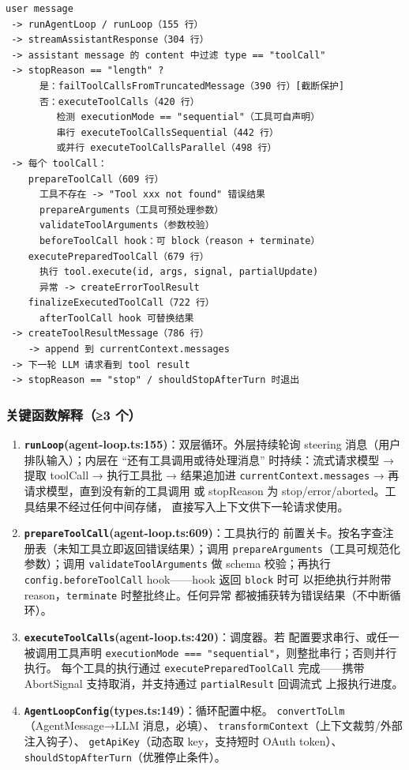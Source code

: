 \begin{verbatim}
user message
 -> runAgentLoop / runLoop（155 行）
 -> streamAssistantResponse（304 行）
 -> assistant message 的 content 中过滤 type == "toolCall"
 -> stopReason == "length" ?
      是：failToolCallsFromTruncatedMessage（390 行）[截断保护]
      否：executeToolCalls（420 行）
         检测 executionMode == "sequential"（工具可自声明）
         串行 executeToolCallsSequential（442 行）
         或并行 executeToolCallsParallel（498 行）
 -> 每个 toolCall：
    prepareToolCall（609 行）
      工具不存在 -> "Tool xxx not found" 错误结果
      prepareArguments（工具可预处理参数）
      validateToolArguments（参数校验）
      beforeToolCall hook：可 block（reason + terminate）
    executePreparedToolCall（679 行）
      执行 tool.execute(id, args, signal, partialUpdate)
      异常 -> createErrorToolResult
    finalizeExecutedToolCall（722 行）
      afterToolCall hook 可替换结果
 -> createToolResultMessage（786 行）
    -> append 到 currentContext.messages
 -> 下一轮 LLM 请求看到 tool result
 -> stopReason == "stop" / shouldStopAfterTurn 时退出
\end{verbatim}

\subsubsection{关键函数解释（≥3 个）}

\begin{enumerate}[leftmargin=4em,itemsep=0pt,topsep=2pt]
    \item \textbf{\texttt{runLoop}(agent-loop.ts:155)}：双层循环。外层持续轮询
          steering 消息（用户排队输入）；内层在 ``还有工具调用或待处理消息''
          时持续：流式请求模型 → 提取 toolCall → 执行工具批 → 结果追加进
          \texttt{currentContext.messages} → 再请求模型，直到没有新的工具调用
          或 stopReason 为 stop/error/aborted。工具结果不经过任何中间存储，
          直接写入上下文供下一轮请求使用。
    \item \textbf{\texttt{prepareToolCall}(agent-loop.ts:609)}：工具执行的
          前置关卡。按名字查注册表（未知工具立即返回错误结果）；调用
          \texttt{prepareArguments}（工具可规范化参数）；调用
          \texttt{validateToolArguments} 做 schema 校验；再执行
          \texttt{config.beforeToolCall} hook——hook 返回 \texttt{block} 时可
          以拒绝执行并附带 reason，\texttt{terminate} 时整批终止。任何异常
          都被捕获转为错误结果（不中断循环）。
    \item \textbf{\texttt{executeToolCalls}(agent-loop.ts:420)}：调度器。若
          配置要求串行、或任一被调用工具声明
          \texttt{executionMode === "sequential"}，则整批串行；否则并行执行。
          每个工具的执行通过 \texttt{executePreparedToolCall} 完成——携带
          AbortSignal 支持取消，并支持通过 \texttt{partialResult} 回调流式
          上报执行进度。
    \item \textbf{\texttt{AgentLoopConfig}(types.ts:149)}：循环配置中枢。
          \texttt{convertToLlm}（AgentMessage→LLM 消息，必填）、
          \texttt{transformContext}（上下文裁剪/外部注入钩子）、
          \texttt{getApiKey}（动态取 key，支持短时 OAuth token）、
          \texttt{shouldStopAfterTurn}（优雅停止条件）。
\end{enumerate}

